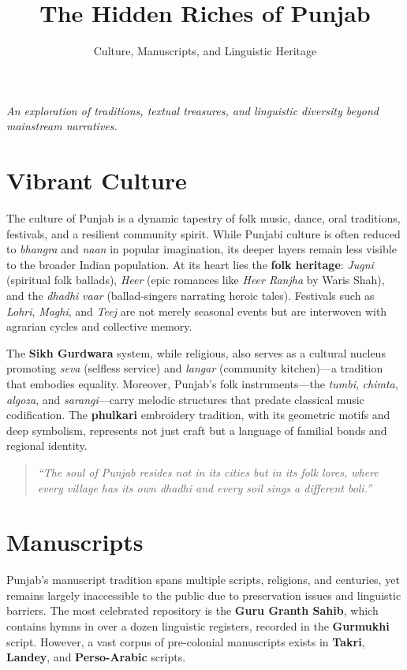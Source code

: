 \documentclass{article}
\title{\textbf{The Hidden Riches of Punjab}}
\subtitle{Culture, Manuscripts, and Linguistic Heritage}
\author{}
\date{}
\begin{document}
\maketitle

\begin{center}
\textit{An exploration of traditions, textual treasures, and linguistic diversity beyond mainstream narratives.}
\end{center}

\section{Vibrant Culture}
The culture of Punjab is a dynamic tapestry of folk music, dance, oral traditions, festivals, and a resilient community spirit. While Punjabi culture is often reduced to \textit{bhangra} and \textit{naan} in popular imagination, its deeper layers remain less visible to the broader Indian population. At its heart lies the \textbf{folk heritage}: \textit{Jugni} (spiritual folk ballads), \textit{Heer} (epic romances like \textit{Heer Ranjha} by Waris Shah), and the \textit{dhadhi} \textit{vaar} (ballad-singers narrating heroic tales). Festivals such as \textit{Lohri}, \textit{Maghi}, and \textit{Teej} are not merely seasonal events but are interwoven with agrarian cycles and collective memory.

The \textbf{Sikh Gurdwara} system, while religious, also serves as a cultural nucleus promoting \textit{seva} (selfless service) and \textit{langar} (community kitchen)—a tradition that embodies equality. Moreover, Punjab's folk instruments—the \textit{tumbi}, \textit{chimta}, \textit{algoza}, and \textit{sarangi}—carry melodic structures that predate classical music codification. The \textbf{phulkari} embroidery tradition, with its geometric motifs and deep symbolism, represents not just craft but a language of familial bonds and regional identity.

\begin{quote}
\textit{``The soul of Punjab resides not in its cities but in its folk lores, where every village has its own \textit{dhadhi} and every soil sings a different \textit{boli}.''} \cite{singh2018folk}
\end{quote}

\section{Manuscripts}
Punjab’s manuscript tradition spans multiple scripts, religions, and centuries, yet remains largely inaccessible to the public due to preservation issues and linguistic barriers. The most celebrated repository is the \textbf{Guru Granth Sahib}, which contains hymns in over a dozen linguistic registers, recorded in the \textbf{Gurmukhi} script. However, a vast corpus of pre-colonial manuscripts exists in \textbf{Takri}, \textbf{Landey}, and \textbf{Perso-Arabic} scripts.
\end{document}
